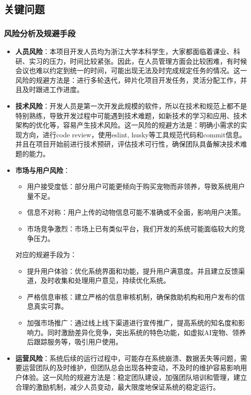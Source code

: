 \documentclass[12pt,a4paper,UTF8]{article}
\begin{document}
\subsection{关键问题}

\subsubsection{风险分析及规避手段}
\begin{itemize}
  \item \textbf{人员风险}：本项目开发人员均为浙江大学本科学生，大家都面临着课业、科研、实习的压力，时间比较紧张。因此，在人员管理方面会比较困难，有时候会议也难以约定到统一的时间，可能出现无法及时完成规定任务的情况。这一风险的规避方法是：进行多轮迭代，碎片化项目开发任务，灵活分配工作，并且及时跟进工作进度。
  \item \textbf{技术风险}：开发人员是第一次开发此规模的软件，所以在技术和规范上都不是特别熟练，导致开发过程中可能遇到技术难题，如新技术的学习和应用、技术架构的优化等，容易产生技术风险。这一风险的规避方法是：明确小需求的实现方向，进行code review，使用eslint, husky等工具规范代码和commit信息。并且在项目开始前进行技术预研，评估技术可行性，确保团队具备解决技术难题的能力。
  \item \textbf{市场与用户风险}：
  \begin{itemize}
    \item 用户接受度低：部分用户可能更倾向于购买宠物而非领养，导致系统用户量不足。
    \item 信息不对称：用户上传的动物信息可能不准确或不全面，影响用户决策。
    \item 市场竞争激烈：市场上已有类似平台，我们开发的系统可能面临较大的竞争压力。
  \end{itemize}
  对应的规避手段为：
  \begin{itemize}
    \item 提升用户体验：优化系统界面和功能，提升用户满意度。并且建立反馈渠道，及时收集和处理用户意见，持续优化系统。
    \item 严格信息审核：建立严格的信息审核机制，确保救助机构和用户发布的信息真实可靠。
    \item 加强市场推广：通过线上线下渠道进行宣传推广，提高系统的知名度和影响力。同时激励差异化竞争，突出系统的特色功能，如虚拟AI宠物、领养后跟踪服务等，吸引用户使用。
  \end{itemize}
  \item \textbf{运营风险}：系统后续的运行过程中，可能存在系统崩溃、数据丢失等问题，需要运营团队的及时维护，但团队总会出现各种变动，不及时的维护容易影响用户体验。这一风险的规避方法是：稳定团队建设，加强团队培训和管理，建立合理的激励机制，减少人员变动，最大限度地保证系统的稳定运行。
\end{itemize}
\end{document}
